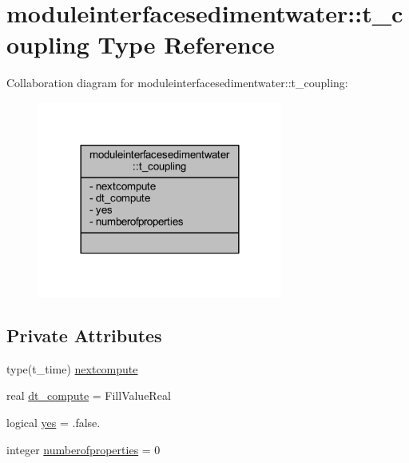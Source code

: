 \hypertarget{structmoduleinterfacesedimentwater_1_1t__coupling}{}\section{moduleinterfacesedimentwater\+:\+:t\+\_\+coupling Type Reference}
\label{structmoduleinterfacesedimentwater_1_1t__coupling}


Collaboration diagram for moduleinterfacesedimentwater\+:\+:t\+\_\+coupling\+:\nopagebreak
\begin{figure}[H]
\begin{center}
\leavevmode
\includegraphics[width=228pt]{structmoduleinterfacesedimentwater_1_1t__coupling__coll__graph}
\end{center}
\end{figure}
\subsection*{Private Attributes}
\begin{DoxyCompactItemize}
\item 
type(t\+\_\+time) \mbox{\hyperlink{structmoduleinterfacesedimentwater_1_1t__coupling_aaeefdad1254d0869ec2b7914699d253b}{nextcompute}}
\item 
real \mbox{\hyperlink{structmoduleinterfacesedimentwater_1_1t__coupling_a701c40fbcaeb1c61862da09399aafdd2}{dt\+\_\+compute}} = Fill\+Value\+Real
\item 
logical \mbox{\hyperlink{structmoduleinterfacesedimentwater_1_1t__coupling_a6c208740b61176664022690909c31b2a}{yes}} = .false.
\item 
integer \mbox{\hyperlink{structmoduleinterfacesedimentwater_1_1t__coupling_a579c537ea6bddc8116bd54b67c445cd0}{numberofproperties}} = 0
\end{DoxyCompactItemize}



